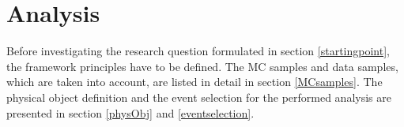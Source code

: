 \chapter{Analysis}\label{analysis}
Before investigating the research question formulated in section \ref{startingpoint}, the framework principles have to be defined. The MC samples and data samples, which are taken into account, are listed in detail in section \ref{MCsamples}. The physical object definition and the event selection for the performed analysis are presented in section \ref{physObj} and \ref{eventselection}.  

